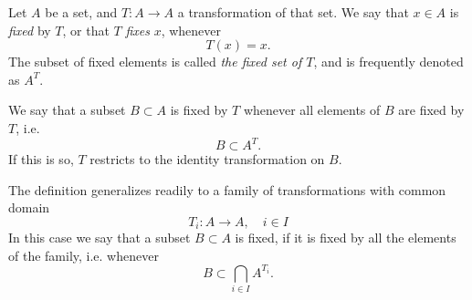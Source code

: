 \documentclass[12pt]{article}
\begin{document}
Let $A$ be a set, and   $T:A\rightarrow A$ a transformation of that
set.  We say that $x\in A$ is 
\emph{fixed} by $T$, or that $T$ \emph{fixes} $x$, whenever
$$T(x)=x.$$
The subset of fixed elements is called {\em the fixed set of $T$}, and is frequently denoted as $A^T$.

We say that a subset $B\subset A$ is
fixed by $T$ whenever all elements of $B$ are fixed by $T$,
i.e. $$B\subset A^T.$$   If this is so,  $T$ restricts to the identity
transformation on $B$.

The definition generalizes readily to a family of transformations with
common domain
$$T_i : A\rightarrow A,\quad i\in I$$
In this case we say that a subset $B\subset A$ is fixed, if it is fixed
by all the elements of the family, i.e. whenever
$$B\subset \bigcap_{i\in I} A^{T_i}.$$



\end{document}
